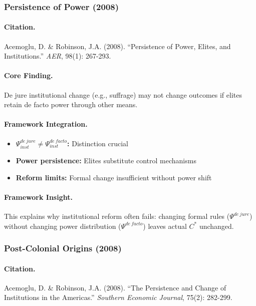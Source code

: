 \documentclass[12pt,a4paper]{article}
\begin{document}
\subsubsection{Persistence of Power (2008)}

\paragraph{Citation.}
Acemoglu, D. \& Robinson, J.A. (2008).
``Persistence of Power, Elites, and Institutions.'' \emph{AER}, 98(1): 267-293.

\paragraph{Core Finding.}
De jure institutional change (e.g., suffrage) may not change outcomes
if elites retain de facto power through other means.

\paragraph{Framework Integration.}
\begin{itemize}
  \item \textbf{$\Psi_{inst}^{de\ jure} \neq \Psi_{inst}^{de\ facto}$:} Distinction crucial
  \item \textbf{Power persistence:} Elites substitute control mechanisms
  \item \textbf{Reform limits:} Formal change insufficient without power shift
\end{itemize}

\paragraph{Framework Insight.}
This explains why institutional reform often fails: changing formal rules
($\Psi^{de\ jure}$) without changing power distribution ($\Psi^{de\ facto}$)
leaves actual $C^*$ unchanged.

\subsubsection{Post-Colonial Origins (2008)}

\paragraph{Citation.}
Acemoglu, D. \& Robinson, J.A. (2008).
``The Persistence and Change of Institutions in the Americas.''
\emph{Southern Economic Journal}, 75(2): 282-299.
\end{document}
